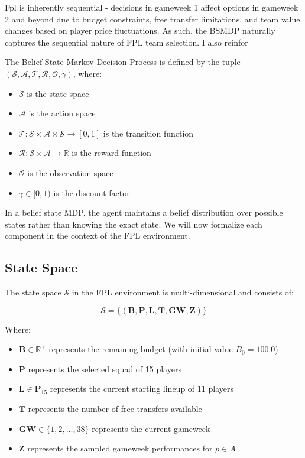 Fpl is inherently sequential - decisions in gameweek 1 affect options in gameweek 2 and beyond due to budget constraints, free transfer limitations, and team value changes based on player price fluctuations. As such, the BSMDP naturally captures the sequential nature of FPL team selection. I also reinfor

The Belief State Markov Decision Process is defined by the tuple $(\mathcal{S}, \mathcal{A}, \mathcal{T}, \mathcal{R}, \mathcal{O}, \gamma)$, where:
\begin{itemize}
    \item $\mathcal{S}$ is the state space
    \item $\mathcal{A}$ is the action space
    \item $\mathcal{T}: \mathcal{S} \times \mathcal{A} \times \mathcal{S} \rightarrow [0, 1]$ is the transition function
    \item $\mathcal{R}: \mathcal{S} \times \mathcal{A} \rightarrow \mathbb{R}$ is the reward function
    \item $\mathcal{O}$ is the observation space
    \item $\gamma \in [0, 1)$ is the discount factor
\end{itemize}

In a belief state MDP, the agent maintains a belief distribution over possible states rather than knowing the exact state. We will now formalize each component in the context of the FPL environment.

\subsection{State Space}

The state space $\mathcal{S}$ in the FPL environment is multi-dimensional and consists of:

\[\mathcal{S} = \{(\mathbf{B}, \mathbf{P}, \mathbf{L}, \mathbf{T}, \mathbf{GW}, \mathbf{Z})\}\]

Where:
\begin{itemize}
    \item $\mathbf{B} \in \mathbb{R}^+$ represents the remaining budget (with initial value $B_0 = 100.0$)
    \item $\mathbf{P}$ represents the selected squad of 15 players
    \item $\mathbf{L} \in \mathbf{P}_{15}$ represents the current starting lineup of 11 players 
    \item $\mathbf{T}$ represents the number of free transfers available
    \item $\mathbf{GW} \in \{1, 2, ..., 38\}$ represents the current gameweek
    \item $\mathbf{Z}$ represents the sampled gameweek performances for $p \in A$
\end{itemize}

